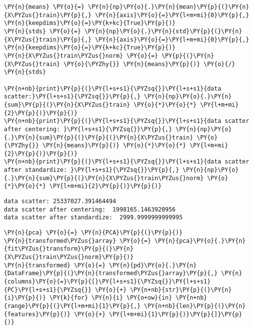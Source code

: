     \begin{tcolorbox}[breakable, size=fbox, boxrule=1pt, pad at break*=1mm,colback=cellbackground, colframe=cellborder]
\begin{Verbatim}[commandchars=\\\{\}]
\PY{n}{means} \PY{o}{=} \PY{n}{np}\PY{o}{.}\PY{n}{mean}\PY{p}{(}\PY{n}{X\PYZus{}train}\PY{p}{,} \PY{n}{axis}\PY{o}{=}\PY{l+m+mi}{0}\PY{p}{,} \PY{n}{keepdims}\PY{o}{=}\PY{k+kc}{True}\PY{p}{)}
\PY{n}{stds} \PY{o}{=} \PY{n}{np}\PY{o}{.}\PY{n}{std}\PY{p}{(}\PY{n}{X\PYZus{}train}\PY{p}{,} \PY{n}{axis}\PY{o}{=}\PY{l+m+mi}{0}\PY{p}{,} \PY{n}{keepdims}\PY{o}{=}\PY{k+kc}{True}\PY{p}{)}
\PY{n}{X\PYZus{}train\PYZus{}norm} \PY{o}{=} \PY{p}{(}\PY{n}{X\PYZus{}train} \PY{o}{\PYZhy{}} \PY{n}{means}\PY{p}{)} \PY{o}{/} \PY{n}{stds}

\PY{n+nb}{print}\PY{p}{(}\PY{l+s+s1}{\PYZsq{}}\PY{l+s+s1}{data scatter:}\PY{l+s+s1}{\PYZsq{}}\PY{p}{,} \PY{n}{np}\PY{o}{.}\PY{n}{sum}\PY{p}{(}\PY{n}{X\PYZus{}train} \PY{o}{*}\PY{o}{*} \PY{l+m+mi}{2}\PY{p}{)}\PY{p}{)}
\PY{n+nb}{print}\PY{p}{(}\PY{l+s+s1}{\PYZsq{}}\PY{l+s+s1}{data scatter after centering: }\PY{l+s+s1}{\PYZsq{}}\PY{p}{,} \PY{n}{np}\PY{o}{.}\PY{n}{sum}\PY{p}{(}\PY{p}{(}\PY{n}{X\PYZus{}train} \PY{o}{\PYZhy{}} \PY{n}{means}\PY{p}{)} \PY{o}{*}\PY{o}{*} \PY{l+m+mi}{2}\PY{p}{)}\PY{p}{)}
\PY{n+nb}{print}\PY{p}{(}\PY{l+s+s1}{\PYZsq{}}\PY{l+s+s1}{data scatter after standardize: }\PY{l+s+s1}{\PYZsq{}}\PY{p}{,} \PY{n}{np}\PY{o}{.}\PY{n}{sum}\PY{p}{(}\PY{n}{X\PYZus{}train\PYZus{}norm} \PY{o}{*}\PY{o}{*} \PY{l+m+mi}{2}\PY{p}{)}\PY{p}{)}
\end{Verbatim}
\end{tcolorbox}

    \begin{Verbatim}[commandchars=\\\{\}]
data scatter: 25337027.391464494
data scatter after centering:  1998165.1463920956
data scatter after standardize:  2999.9999999999995
    \end{Verbatim}

    \begin{tcolorbox}[breakable, size=fbox, boxrule=1pt, pad at break*=1mm,colback=cellbackground, colframe=cellborder]
\begin{Verbatim}[commandchars=\\\{\}]
\PY{n}{pca} \PY{o}{=} \PY{n}{PCA}\PY{p}{(}\PY{p}{)}
\PY{n}{transformed\PYZus{}array} \PY{o}{=} \PY{n}{pca}\PY{o}{.}\PY{n}{fit\PYZus{}transform}\PY{p}{(}\PY{n}{X\PYZus{}train\PYZus{}norm}\PY{p}{)}
\PY{n}{transformed} \PY{o}{=} \PY{n}{pd}\PY{o}{.}\PY{n}{DataFrame}\PY{p}{(}\PY{n}{transformed\PYZus{}array}\PY{p}{,} \PY{n}{columns}\PY{o}{=}\PY{p}{[}\PY{l+s+s1}{\PYZsq{}}\PY{l+s+s1}{PC}\PY{l+s+s1}{\PYZsq{}} \PY{o}{+} \PY{n+nb}{str}\PY{p}{(}\PY{n}{i}\PY{p}{)} \PY{k}{for} \PY{n}{i} \PY{o+ow}{in} \PY{n+nb}{range}\PY{p}{(}\PY{l+m+mi}{1}\PY{p}{,} \PY{n+nb}{len}\PY{p}{(}\PY{n}{features}\PY{p}{)} \PY{o}{+} \PY{l+m+mi}{1}\PY{p}{)}\PY{p}{]}\PY{p}{)}
\end{Verbatim}
\end{tcolorbox}

